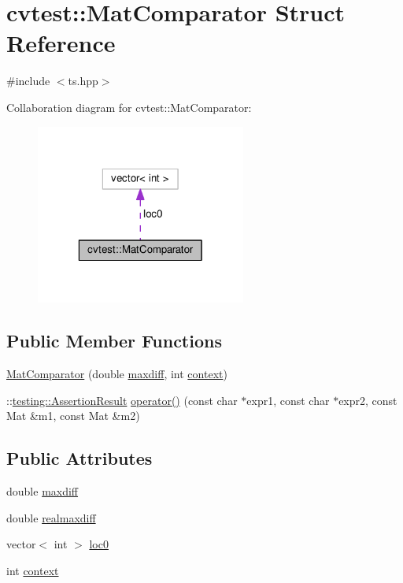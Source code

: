 \hypertarget{structcvtest_1_1MatComparator}{\section{cvtest\-:\-:Mat\-Comparator Struct Reference}
\label{structcvtest_1_1MatComparator}
}


{\ttfamily \#include $<$ts.\-hpp$>$}



Collaboration diagram for cvtest\-:\-:Mat\-Comparator\-:\nopagebreak
\begin{figure}[H]
\begin{center}
\leavevmode
\includegraphics[width=196pt]{structcvtest_1_1MatComparator__coll__graph}
\end{center}
\end{figure}
\subsection*{Public Member Functions}
\begin{DoxyCompactItemize}
\item 
\hyperlink{structcvtest_1_1MatComparator_aff910a0f36aec13ad114fdd49e8bb149}{Mat\-Comparator} (double \hyperlink{structcvtest_1_1MatComparator_a9fefb3c76f6b4ddf64aa35064124061e}{maxdiff}, int \hyperlink{structcvtest_1_1MatComparator_a297f8cc72e3d931ce1ae4a76d613a8db}{context})
\item 
\-::\hyperlink{classtesting_1_1AssertionResult}{testing\-::\-Assertion\-Result} \hyperlink{structcvtest_1_1MatComparator_a11fc7bb9683caae132b7cc03afa04cad}{operator()} (const char $\ast$expr1, const char $\ast$expr2, const Mat \&m1, const Mat \&m2)
\end{DoxyCompactItemize}
\subsection*{Public Attributes}
\begin{DoxyCompactItemize}
\item 
double \hyperlink{structcvtest_1_1MatComparator_a9fefb3c76f6b4ddf64aa35064124061e}{maxdiff}
\item 
double \hyperlink{structcvtest_1_1MatComparator_a67d2d16b6cfdb37bea18b9980d8a5dee}{realmaxdiff}
\item 
vector$<$ int $>$ \hyperlink{structcvtest_1_1MatComparator_a34e7064df4897197ce644a36b3544619}{loc0}
\item 
int \hyperlink{structcvtest_1_1MatComparator_a297f8cc72e3d931ce1ae4a76d613a8db}{context}
\end{DoxyCompactItemize}


